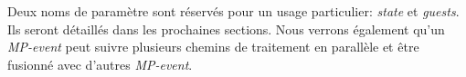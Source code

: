 \noindent Deux noms de paramètre sont réservés pour un usage particulier: \textit{state} et \textit{guests}. Ils seront détaillés dans les prochaines sections. Nous verrons également qu'un \textit{MP-event} peut suivre plusieurs chemins de traitement en parallèle et être fusionné avec d'autres \textit{MP-event}. 


